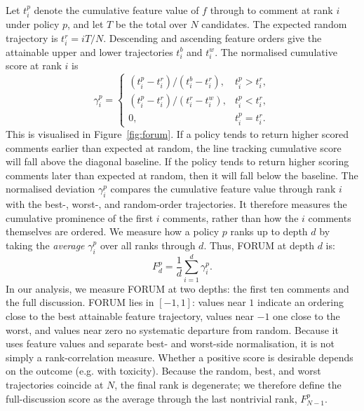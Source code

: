 Let $t_i^p$ denote the cumulative feature value of $f$ through to comment at rank $i$ under policy $p$, and let $T$ be the total over $N$ candidates. The expected random trajectory is $t_i^r=iT/N$. Descending and ascending feature orders give the attainable upper and lower trajectories $t_i^b$ and $t_i^w$. The normalised cumulative score at rank $i$ is
\begin{equation}
\gamma_i^p=\begin{cases}
(t_i^p-t_i^r)/(t_i^b-t_i^r),&t_i^p>t_i^r,\\
(t_i^p-t_i^r)/(t_i^r-t_i^w),&t_i^p<t_i^r,\\
0,&t_i^p=t_i^r.
\end{cases}
\end{equation}
This is visualised in Figure~\ref{fig:forum}. If a policy tends to return higher scored comments earlier than expected at random, the line tracking cumulative score will fall above the diagonal baseline. If the policy tends to return higher scoring comments later than expected at random, then it will fall below the baseline. The normalised deviation $\gamma_i^p$ compares the cumulative feature value through rank $i$ with the best-, worst-, and random-order trajectories. It therefore measures the cumulative prominence of the first $i$ comments, rather than how the $i$ comments themselves are ordered. We measure how a policy $p$ ranks up to depth $d$ by taking the \emph{average} $\gamma_i^p$ over all ranks through $d$. Thus, FORUM at depth $d$ is:
\begin{equation}
F_d^p=\frac{1}{d}\sum_{i=1}^{d}\gamma_i^p.
\end{equation}
In our analysis, we measure FORUM at two depths: the first ten comments and the full discussion. FORUM lies in $[-1,1]$: values near $1$ indicate an ordering close to the best attainable feature trajectory, values near $-1$ one close to the worst, and values near zero no systematic departure from random. Because it uses feature values and separate best- and worst-side normalisation, it is not simply a rank-correlation measure. Whether a positive score is desirable depends on the outcome (e.g. with toxicity). Because the random, best, and worst trajectories coincide at $N$, the final rank is degenerate; we therefore define the full-discussion score as the average through the last nontrivial rank, $F_{N-1}^p$.

